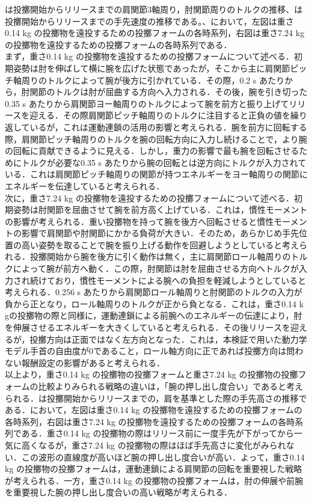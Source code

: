 は投擲開始からリリースまでの肩関節3軸周り，肘関節周りのトルクの推移、は投擲開始からリリースまでの手先速度の推移である。、において，左図は重さ0.14 kg の投擲物を遠投するための投擲フォームの各時系列，右図は重さ7.24 kg の投擲物を遠投するための投擲フォームの各時系列である．\\
まず，重さ0.14 kg の投擲物を遠投するための投擲フォームについて述べる．初期姿勢は肘を伸ばして横に腕を広げた状態であったが，そこから主に肩関節ピッチ軸周りのトルクによって腕が後方に引かれている．その際，0.2 s あたりから，肘関節のトルクは肘が屈曲する方向へ入力される．その後，腕を引き切った0.35 s あたりから肩関節ヨー軸周りのトルクによって腕を前方と振り上げてリリースを迎える．その際肩関節ピッチ軸周りのトルクに注目すると正負の値を繰り返しているが，これは運動連鎖の活用の影響と考えられる．腕を前方に回転する際，肩関節ピッチ軸周りのトルクを腕の回転方向に入力し続けることで，より腕の回転に貢献できるように見える．しかし，重力の影響で最も腕を回転させるためにトルクが必要な0.35 s あたりから腕の回転とは逆方向にトルクが入力されている．これは肩関節ピッチ軸周りの関節が持つエネルギーをヨー軸周りの関節にエネルギーを伝達していると考えられる．\\
次に，重さ7.24 kg の投擲物を遠投するための投擲フォームについて述べる．初期姿勢は肘関節を屈曲させて腕を前方高く上げている．これは，慣性モーメントの影響が考えられる．重い投擲物を持って腕を後方へ回転させると慣性モーメントの影響で肩関節や肘関節にかかる負荷が大きい．そのため，あらかじめ手先位置の高い姿勢を取ることで腕を振り上げる動作を回避しようとしていると考えられる．投擲開始から腕を後方に引く動作は無く，主に肩関節ロール軸周りのトルクによって腕が前方へ動く．この際，肘関節は肘を屈曲させる方向へトルクが入力され続けており，慣性モーメントによる腕への負担を軽減しようとしていると考えられる．0.256 s あたりから肩関節ロール軸周りと肘関節のトルクの入力が負から正となり，ロール軸周りのトルクが正から負となる．これは，重さ0.14 k gの投擲物の際と同様に，運動連鎖による前腕へのエネルギーの伝達により，肘を伸展させるエネルギーを大きくしていると考えられる．その後リリースを迎えるが，投擲方向は正面ではなく左方向となった．これは，本検証で用いた動力学モデル手首の自由度が0であること，ロール軸方向に正であれば投擲方向は問わない報酬設定の影響があると考えられる．\\
以上より，重さ0.14 kg の投擲物の投擲フォームと重さ7.24 kg の投擲物の投擲フォームの比較よりみられる戦略の違いは，「腕の押し出し度合い」であると考えられる．は投擲開始からリリースまでの，肩を基準とした際の手先高さの推移である．において，左図は重さ0.14 kg の投擲物を遠投するための投擲フォームの各時系列，右図は重さ7.24 kg の投擲物を遠投するための投擲フォームの各時系列である．重さ0.14 kg の投擲物の際はリリース前に一度手先が下がってから一気に高くなるが，重さ7.24 kg の投擲物の際はほば手先高さに変化がみられない．この波形の直線度が高いほど腕の押し出し度合いが高い．よって，重さ0.14 kg の投擲物の投擲フォームは，運動連鎖による肩関節の回転を重要視した戦略が考えられる．一方，重さ0.14 kg の投擲物の投擲フォームは，肘の伸展や前腕を重要視した腕の押し出し度合いの高い戦略が考えられる．

